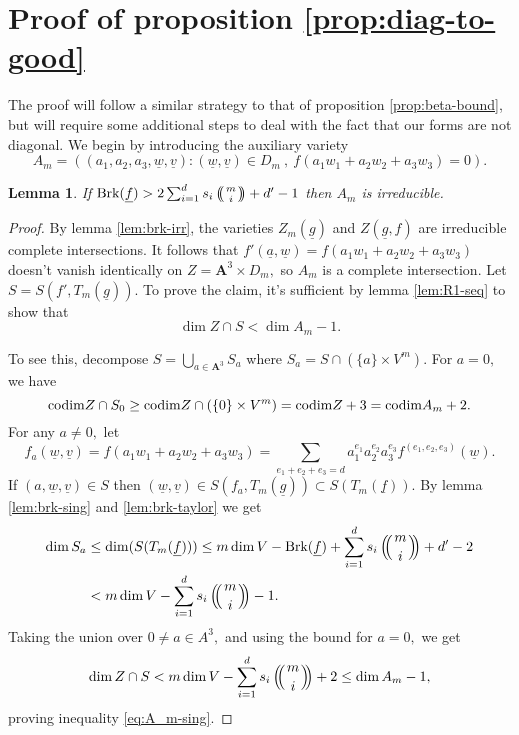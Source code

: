 \documentclass[12pt]{amsart}
\let\ul\underline
\newtheorem{lemma}[theorem]{Lemma}
\theoremstyle{definition}
\def\multiset#1#2{\ensuremath{\left(\kern-.3em\left(\genfrac{}{}{0pt}{}{#1}{#2}\right)\kern-.3em\right)}}
\newcommand{\A}{\mathbf{A}}
\newcommand{\codim}{\textnormal{codim}}
\newcommand{\brk}{\textnormal{Brk}}
\let\ul\underline
\begin{document}
\section{Proof of proposition \ref{prop:diag-to-good}}

    The proof will follow a similar strategy to that of proposition \ref{prop:beta-bound}, but will require some additional steps to deal with the fact that our forms are not diagonal. We begin by introducing the auxiliary variety
    \[
    A_m = ((a_1,a_2,a_3,\ul{w},\ul{v}):(\ul{w},\ul{v}) \in D_m\ ,\ f(a_1w_1+a_2w_2+a_3w_3) = 0).
    \]
    
    \begin{lemma}\label{lem:A_m-irr}
        If $ \brk(\ul{f}) >  2\sum_{i=1}^d s_i \multiset{m}{i}+d'-1 $ then $A_m$ is irreducible.
    \end{lemma}

    \begin{proof}
         By lemma \ref{lem:brk-irr}, the varieties $Z_m(\ul{g})$ and $Z(\ul{g},f)$ are irreducible complete intersections. It follows that $f'(\ul{a},\ul{w}) = f(a_1w_1+a_2w_2+a_3w_3)$ doesn't vanish identically on $Z = \A^3\times D_m,$ so $A_m$ is a complete intersection. Let $S = S(f',T_m(\ul{g})).$ To prove the claim, it's sufficient  by lemma \ref{lem:R1-seq} to show that
         \begin{equation}\label{eq:A_m-sing}
             \dim Z\cap  S  < \dim A_m-1.
         \end{equation}
    
    To see this, decompose $ S = \bigcup_{a\in \A^3} S_a$ where $S_a = S\cap (\{a\}\times V^m).$  For $a = 0,$ we have
    \[
    \codim Z\cap  S_0 \ge \codim Z\cap (\{0\}\times V^m) = \codim Z+3   = \codim A_m+2.
    \]
    For any $a\neq 0,$ let  
    \[
    f_a(\ul{w},\ul{v}) = f(a_1w_1+a_2w_2+a_3w_3) = \sum_{e_1+e_2+e_3 = d} a_1^{e_1} a_2^{e_2} a_3^{e_3} f^{(e_1,e_2,e_3)}(\ul{w}).
    \]
    If $(a,\ul{w},\ul{v})\in S$ then $(\ul{w},\ul{v})\in S(f_a, T_m(\ul{g}))\subset S(T_m(\ul{f})).$ By lemma \ref{lem:brk-sing} and \ref{lem:brk-taylor} we get
    \begin{align*}
         \dim S_a &\le \dim(S(T_m(\ul{f}))) \le  m\dim V - \brk(\ul{f}) + \sum_{i=1}^d s_i\multiset{m}{i} + d' -2  \\
         &< m\dim V -  \sum_{i=1}^d s_i \multiset{m}{i} -1.
    \end{align*}
    Taking the union over $0\neq a\in A^3,$ and using the bound for $a=0,$ we get
    \[
    \dim Z\cap S <  m\dim V -  \sum_{i=1}^d s_i \multiset{m}{i} +2 \le \dim A_m-1,
    \]
    proving inequality \eqref{eq:A_m-sing}.
    \end{proof}
\end{document}
